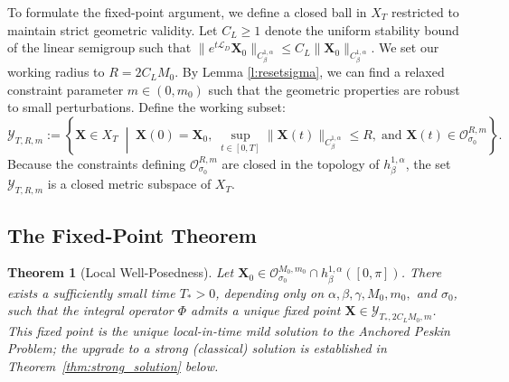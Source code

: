 \documentclass{amsart}
\newtheorem{theorem}{Theorem}[section]
\begin{document}
To formulate the fixed-point argument, we define a closed ball in $X_T$ restricted to maintain strict geometric validity. Let $C_L \ge 1$ denote the uniform stability bound of the linear semigroup such that $\|e^{t\mathcal{L}_D}\mathbf{X}_0\|_{C^{1,\alpha}_\beta} \le C_L \|\mathbf{X}_0\|_{C^{1,\alpha}_\beta}$. We set our working radius to $R = 2C_L M_0$. By Lemma \ref{l:resetsigma}, we can find a relaxed constraint parameter $m \in (0, m_0)$ such that the geometric properties are robust to small perturbations. Define the working subset:
\begin{equation}
\mathcal{Y}_{T, R, m} := \left\{ \mathbf{X} \in X_T \;\middle|\; \mathbf{X}(0) = \mathbf{X}_0,\; \sup_{t \in [0,T]} \|\mathbf{X}(t)\|_{C^{1,\alpha}_\beta} \le R,\; \text{and } \mathbf{X}(t) \in \mathcal{O}^{R, m}_{\sigma_0} \right\}.
\end{equation}
Because the constraints defining $\mathcal{O}^{R,m}_{\sigma_0}$ are closed in the topology of $h^{1,\alpha}_\beta$, the set $\mathcal{Y}_{T, R, m}$ is a closed metric subspace of $X_T$.

\subsection{The Fixed-Point Theorem}

\begin{theorem}[Local Well-Posedness]\label{thm:local_existence}
Let $\mathbf{X}_0 \in \mathcal{O}^{M_0, m_0}_{\sigma_0} \cap h^{1,\alpha}_\beta([0,\pi])$. There exists a sufficiently small time $T_* > 0$, depending only on $\alpha, \beta, \gamma, M_0, m_0,$ and $\sigma_0$, such that the integral operator $\Phi$ admits a unique fixed point $\mathbf{X} \in \mathcal{Y}_{T_*, 2C_L M_0, m}$. This fixed point is the unique local-in-time mild solution to the Anchored Peskin Problem; the upgrade to a strong (classical) solution is established in Theorem~\ref{thm:strong_solution} below.
\end{theorem}
\end{document}
